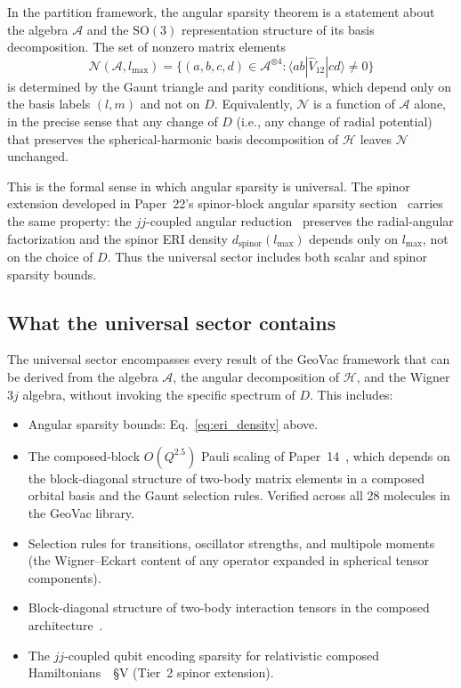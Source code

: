 \documentclass[twocolumn,pra,amsmath,amssymb,superscriptaddress]{revtex4-2}
\begin{document}
In the partition framework, the angular sparsity theorem is a
statement about the algebra $\mathcal{A}$ and the $\mathrm{SO}(3)$
representation structure of its basis decomposition.  The set of
nonzero matrix elements
\[
  \mathcal{N}(\mathcal{A}, l_{\max})
  = \{(a, b, c, d) \in \mathcal{A}^{\otimes 4} :
     \langle a b | \hat{V}_{12} | c d \rangle \ne 0\}
\]
is determined by the Gaunt triangle and parity conditions, which
depend only on the basis labels $(l, m)$ and not on $D$.  Equivalently,
$\mathcal{N}$ is a function of $\mathcal{A}$ alone, in the precise
sense that any change of $D$ (i.e., any change of radial potential)
that preserves the spherical-harmonic basis decomposition of
$\mathcal{H}$ leaves $\mathcal{N}$ unchanged.

This is the formal sense in which angular sparsity is universal.  The
spinor extension developed in Paper~22's spinor-block angular sparsity
section~\cite{paper22} carries the same property: the $jj$-coupled angular reduction~\cite{Dyall} preserves
the radial-angular factorization and the spinor ERI density
$d_{\mathrm{spinor}}(l_{\max})$ depends only on $l_{\max}$, not on the
choice of $D$.  Thus the universal sector includes both scalar and
spinor sparsity bounds.

\subsection{What the universal sector contains}

The universal sector encompasses every result of the GeoVac framework
that can be derived from the algebra $\mathcal{A}$, the angular
decomposition of $\mathcal{H}$, and the Wigner $3j$ algebra,
without invoking the specific spectrum of $D$.  This includes:

\begin{itemize}
\item Angular sparsity bounds: Eq.~\eqref{eq:eri_density} above.
\item The composed-block $O(Q^{2.5})$ Pauli scaling of
  Paper~14~\cite{paper14}, which depends on the block-diagonal
  structure of two-body matrix elements in a composed orbital basis
  and the Gaunt selection rules.  Verified across all 28 molecules
  in the GeoVac library.
\item Selection rules for transitions, oscillator strengths, and
  multipole moments (the Wigner--Eckart content of any operator
  expanded in spherical tensor components).
\item Block-diagonal structure of two-body interaction tensors in
  the composed architecture~\cite{paper17}.
\item The $jj$-coupled qubit encoding sparsity for relativistic
  composed Hamiltonians~\cite{paper14}~\S V (Tier~2 spinor
  extension).
\end{itemize}
\end{document}
